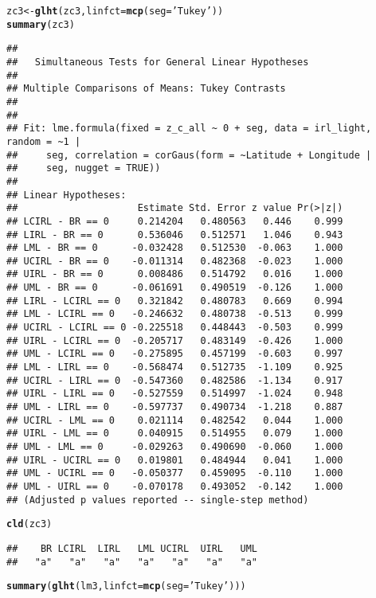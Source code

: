 \documentclass[letterpaper,12pt]{article}\usepackage[]{graphicx}\usepackage[]{color}
\makeatletter
\newcommand{\hlstr}[1]{\textcolor[rgb]{0.192,0.494,0.8}{#1}}%
\newcommand{\hlstd}[1]{\textcolor[rgb]{0.345,0.345,0.345}{#1}}%
\newcommand{\hlkwb}[1]{\textcolor[rgb]{0.69,0.353,0.396}{#1}}%
\newcommand{\hlkwc}[1]{\textcolor[rgb]{0.333,0.667,0.333}{#1}}%
\newcommand{\hlkwd}[1]{\textcolor[rgb]{0.737,0.353,0.396}{\textbf{#1}}}%
\newenvironment{kframe}{%
 \def\at@end@of@kframe{}%
 \ifinner\ifhmode%
  \def\at@end@of@kframe{\end{minipage}}%
  \begin{minipage}{\columnwidth}%
 \fi\fi%
 \def\FrameCommand##1{\hskip\@totalleftmargin \hskip-\fboxsep
 \colorbox{shadecolor}{##1}\hskip-\fboxsep
     \hskip-\linewidth \hskip-\@totalleftmargin \hskip\columnwidth}%
 \MakeFramed {\advance\hsize-\width
   \@totalleftmargin\z@ \linewidth\hsize
   \@setminipage}}%
 {\par\unskip\endMakeFramed%
 \at@end@of@kframe}
\newenvironment{knitrout}{}{} %
\makeatother
\begin{document}
\begin{knitrout}
\begin{kframe}
\begin{verbatim}
\end{verbatim}
\begin{alltt}
\hlstd{zc3} \hlkwb{<-} \hlkwd{glht}\hlstd{(zc3,} \hlkwc{linfct} \hlstd{=} \hlkwd{mcp}\hlstd{(}\hlkwc{seg} \hlstd{=} \hlstr{'Tukey'}\hlstd{))}
\hlkwd{summary}\hlstd{(zc3)}
\end{alltt}
\begin{verbatim}
## 
## 	 Simultaneous Tests for General Linear Hypotheses
## 
## Multiple Comparisons of Means: Tukey Contrasts
## 
## 
## Fit: lme.formula(fixed = z_c_all ~ 0 + seg, data = irl_light, random = ~1 | 
##     seg, correlation = corGaus(form = ~Latitude + Longitude | 
##     seg, nugget = TRUE))
## 
## Linear Hypotheses:
##                     Estimate Std. Error z value Pr(>|z|)
## LCIRL - BR == 0     0.214204   0.480563   0.446    0.999
## LIRL - BR == 0      0.536046   0.512571   1.046    0.943
## LML - BR == 0      -0.032428   0.512530  -0.063    1.000
## UCIRL - BR == 0    -0.011314   0.482368  -0.023    1.000
## UIRL - BR == 0      0.008486   0.514792   0.016    1.000
## UML - BR == 0      -0.061691   0.490519  -0.126    1.000
## LIRL - LCIRL == 0   0.321842   0.480783   0.669    0.994
## LML - LCIRL == 0   -0.246632   0.480738  -0.513    0.999
## UCIRL - LCIRL == 0 -0.225518   0.448443  -0.503    0.999
## UIRL - LCIRL == 0  -0.205717   0.483149  -0.426    1.000
## UML - LCIRL == 0   -0.275895   0.457199  -0.603    0.997
## LML - LIRL == 0    -0.568474   0.512735  -1.109    0.925
## UCIRL - LIRL == 0  -0.547360   0.482586  -1.134    0.917
## UIRL - LIRL == 0   -0.527559   0.514997  -1.024    0.948
## UML - LIRL == 0    -0.597737   0.490734  -1.218    0.887
## UCIRL - LML == 0    0.021114   0.482542   0.044    1.000
## UIRL - LML == 0     0.040915   0.514955   0.079    1.000
## UML - LML == 0     -0.029263   0.490690  -0.060    1.000
## UIRL - UCIRL == 0   0.019801   0.484944   0.041    1.000
## UML - UCIRL == 0   -0.050377   0.459095  -0.110    1.000
## UML - UIRL == 0    -0.070178   0.493052  -0.142    1.000
## (Adjusted p values reported -- single-step method)
\end{verbatim}
\begin{alltt}
\hlkwd{cld}\hlstd{(zc3)}
\end{alltt}
\begin{verbatim}
##    BR LCIRL  LIRL   LML UCIRL  UIRL   UML 
##   "a"   "a"   "a"   "a"   "a"   "a"   "a"
\end{verbatim}
\begin{alltt}
\hlkwd{summary}\hlstd{(}\hlkwd{glht}\hlstd{(lm3,} \hlkwc{linfct} \hlstd{=} \hlkwd{mcp}\hlstd{(}\hlkwc{seg} \hlstd{=} \hlstr{'Tukey'}\hlstd{)))}

\end{alltt}
\end{kframe}
\end{knitrout}
\end{document}
